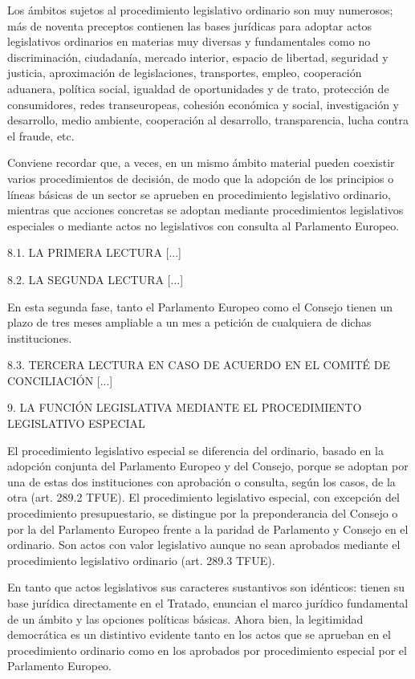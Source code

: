 \documentclass[10pt,a4paper]{article}
\begin{document}
Los ámbitos sujetos al procedimiento legislativo ordinario son muy numerosos; más de noventa preceptos contienen las bases jurídicas para adoptar actos legislativos ordinarios en materias muy diversas y fundamentales como no discriminación, ciudadanía, mercado interior, espacio de libertad, seguridad y justicia, aproximación de legislaciones, transportes, empleo, cooperación aduanera, política social, igualdad de oportunidades y de trato, protección de consumidores, redes transeuropeas, cohesión económica y social, investigación y desarrollo, medio ambiente, cooperación al desarrollo, transparencia, lucha contra el fraude, etc. 

Conviene recordar que, a veces, en un mismo ámbito material pueden coexistir varios procedimientos de decisión, de modo que la adopción de los principios o líneas básicas de un sector se aprueben en procedimiento legislativo ordinario, mientras que acciones concretas se adoptan mediante procedimientos legislativos especiales o mediante actos no legislativos con consulta al Parlamento Europeo.

8.1. LA PRIMERA LECTURA
[...]


8.2. LA SEGUNDA LECTURA
[...]

En esta segunda fase, tanto el Parlamento Europeo como el Consejo tienen un plazo de tres meses ampliable a un mes a petición de cualquiera de dichas instituciones.

8.3. TERCERA LECTURA EN CASO DE ACUERDO EN EL COMITÉ DE CONCILIACIÓN
[...]


9. LA FUNCIÓN LEGISLATIVA MEDIANTE EL PROCEDIMIENTO LEGISLATIVO ESPECIAL

El procedimiento legislativo especial se diferencia del ordinario, basado en la adopción conjunta del Parlamento Europeo y del Consejo, porque se adoptan por una de estas dos instituciones con aprobación o consulta, según los casos, de la otra (art. 289.2 TFUE). El procedimiento legislativo especial, con excepción del procedimiento presupuestario, se distingue por la preponderancia del Consejo o por la del Parlamento Europeo frente a la paridad de Parlamento y Consejo en el ordinario. Son actos con valor legislativo aunque no sean aprobados mediante el procedimiento legislativo ordinario (art. 289.3 TFUE).

En tanto que actos legislativos sus caracteres sustantivos son idénticos: tienen su base jurídica directamente en el Tratado, enuncian el marco jurídico fundamental de un ámbito y las opciones políticas básicas. Ahora bien, la legitimidad democrática es un distintivo evidente tanto en los actos que se aprueban en el procedimiento ordinario como en los aprobados por procedimiento especial por el Parlamento Europeo.
\end{document}
